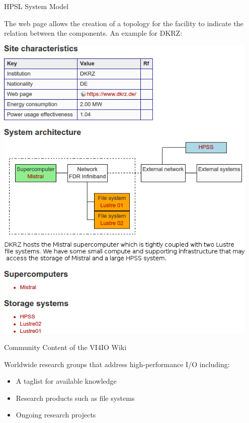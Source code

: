 \documentclass[portrait,a0paper,fontscale=0.4]{baposter}
\newcommand{\compresslist}{%
\setlength{\itemsep}{1pt}%
\setlength{\parskip}{0pt}%
\setlength{\parsep}{0pt}%
}
\begin{document}
\begin{poster}
\begin{posterbox}[name=wps,column=0,above=bottom,below=overview]{HPSL System Model}
\vspace*{-5em}

The web page allows the creation of a topology for the facility to indicate the relation between the components.
An example for DKRZ:

\vspace*{-1em}

\begin{center}
\includegraphics[width=0.95\textwidth]{dkrz-site}
\end{center}

\end{posterbox}


\begin{posterbox}[name=concept,column=1,span=2]{Community Content of the VI4IO Wiki}
\begin{minipage}{7cm}
Worldwide research groups that address high-performance I/O including:

\vspace*{-1em}
\begin{itemize}\compresslist
\item A taglist for available knowledge
\item Research products such as file systems
\item Ongoing research projects
\end{itemize}


\end{minipage}
\end{posterbox}
\end{poster}
\end{document}
